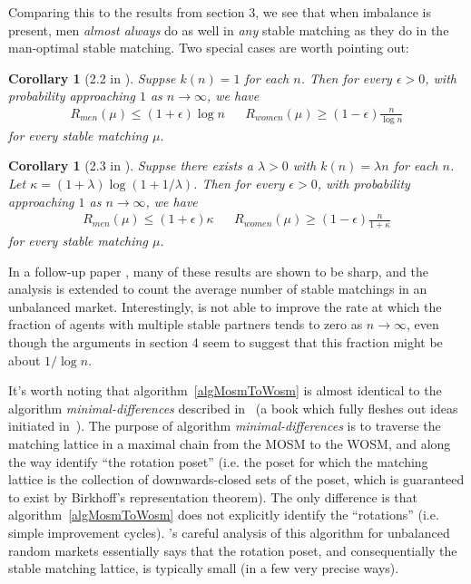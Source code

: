\documentclass[12pt]{article}
\newtheorem{corollary}[definition]{Corollary}
\begin{document}
  Comparing this to the results from section 3, we see that when imbalance is
  present, men \emph{almost always} do as well in \emph{any} stable matching as
  they do in the man-optimal stable matching.
  Two special cases are worth pointing out:

  \begin{corollary}[2.2 in \cite{AshlagiUnbalancedCompetition17}]
    Suppse $k(n) = 1$ for each $n$.
    Then for every $\epsilon>0$, with probability approaching $1$ as
    $n\to\infty$, we have
    \begin{align*}
      R_{men}(\mu) \le (1+\epsilon)\log n &&
      R_{women}(\mu) \ge (1-\epsilon)\frac n {\log n}
    \end{align*}
    for every stable matching $\mu$.
  \end{corollary}

  \begin{corollary}[2.3 in \cite{AshlagiUnbalancedCompetition17}]
    Suppse there exists a $\lambda >0$ with $k(n) = \lambda n$ for each $n$.
    Let $\kappa = (1 + \lambda)\log(1 + 1/\lambda)$.
    Then for every $\epsilon>0$, with probability approaching $1$ as
    $n\to\infty$, we have
    \begin{align*}
      R_{men}(\mu) \le (1+\epsilon)\kappa &&
      R_{women}(\mu) \ge (1-\epsilon)\frac n {1 + \kappa}
    \end{align*}
    for every stable matching $\mu$.
  \end{corollary}

  In a follow-up paper \cite{PittelLikelyStableUnbalanced19}, many of these
  results are shown to be sharp, and the analysis is extended to count the
  average number of stable matchings in an unbalanced market.
  Interestingly, \cite{PittelLikelyStableUnbalanced19} is not able to improve
  the rate at which the fraction of agents with multiple stable partners tends
  to zero as $n\to\infty$, even though the arguments in section 4 seem to
  suggest that this fraction might be about $1/\log n$.

  It's worth noting that algorithm~\ref{algMosmToWosm} is almost identical to the
  algorithm \emph{minimal-differences} described
  in~\cite{GusfieldStableStructureAlgs89} (a book which fully fleshes out
  ideas initiated in~\cite{IrvingCountingStable86}).
  The purpose of algorithm \emph{minimal-differences} is to traverse the
  matching lattice in a maximal chain from the MOSM to the WOSM, and along the
  way identify ``the rotation poset'' (i.e. the poset for which the matching
  lattice is the collection of downwards-closed sets of the poset, which is
  guaranteed to exist by Birkhoff's representation theorem).
  The only difference is that algorithm~\ref{algMosmToWosm} does not explicitly
  identify the ``rotations'' (i.e. simple improvement cycles).
  \cite{AshlagiUnbalancedCompetition17}'s careful analysis of this algorithm
  for unbalanced random markets essentially says that the rotation poset, and
  consequentially the stable matching lattice, is typically small (in a few very
  precise ways).
\end{document}
